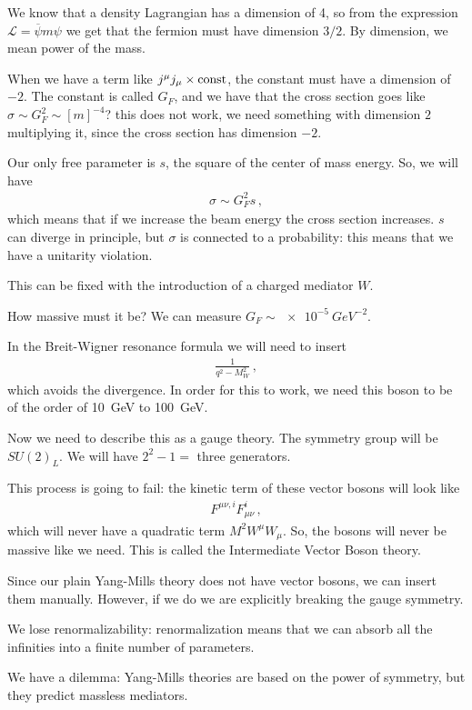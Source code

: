 \documentclass[main.tex]{subfiles}
\begin{document}
We know that a density Lagrangian has a dimension of 4, so from the expression \(\mathscr{L} = \overline{\psi} m \psi \) we get that the fermion must have dimension \(3/2\). 
By dimension, we mean power of the mass.

When we have a term like \(j^{\mu } j_{\mu } \times \text{const}\), the constant must have a dimension of \(-2\). 
The constant is called \(G_F\), and we have that the cross section goes like \(\sigma \sim G_F^{2} \sim [m]^{-4}\)? this does not work, we need something with dimension \(2\) multiplying it, since the cross section has dimension \(-2\). 

Our only free parameter is \(s\), the square of the center of mass energy. So, we will have 
%
\begin{align}
\sigma \sim G_F^2 s
\,,
\end{align}
%
which means that if we increase the beam energy the cross section increases. 
\(s\) can diverge in principle, but \(\sigma \) is connected to a probability: this means that we have a unitarity violation. 

This can be fixed with the introduction of a charged mediator \(W\).

How massive must it be? We can measure \(G_F \sim \SI{e-5}{GeV^{-2}}\). 

In the Breit-Wigner resonance formula we will need to insert 
%
\begin{align}
\frac{1}{q^2- M_W^2}
\,,
\end{align}
%
which avoids the divergence. 
In order for this to work, we need this boson to be of the order of \SI{10}{GeV} to \SI{100}{GeV}.

Now we need to describe this as a gauge theory. The symmetry group will be \(SU(2)_{L}\). We will have \(2^2-1 = \) three generators. 

This process is going to fail: the kinetic term of these vector bosons will look like 
%
\begin{align}
F^{\mu \nu, i} F_{\mu \nu }^{i}
\,,
\end{align}
%
which will never have a quadratic term \(M^2 W^{\mu } W_{\mu }\). 
So, the bosons will never be massive like we need.
This is called the Intermediate Vector Boson theory. 

Since our plain Yang-Mills theory does not have vector bosons, we can insert them manually. 
However, if we do we are explicitly breaking the gauge symmetry.

We lose renormalizability: renormalization means that we can absorb all the infinities into a finite number of parameters.

We have a dilemma: Yang-Mills theories are based on the power of symmetry, but they predict massless mediators. 
\end{document}
